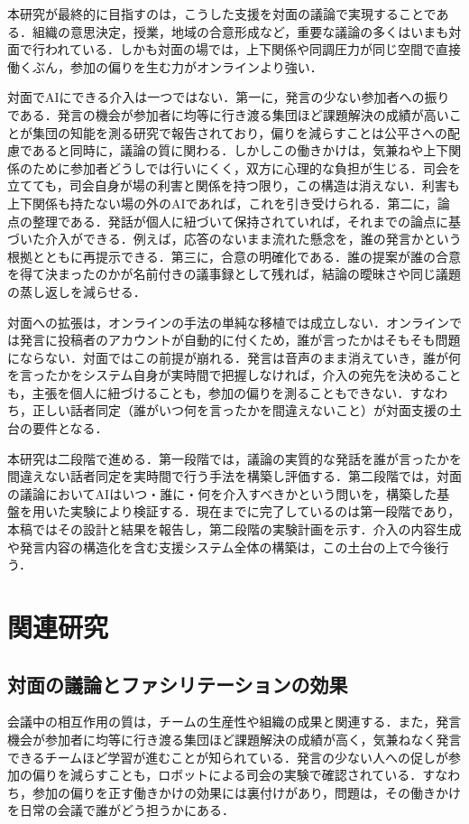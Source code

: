 \documentclass[a4paper]{ltjsarticle}
\begin{document}
本研究が最終的に目指すのは，こうした支援を対面の議論で実現することである．組織の意思決定，授業，地域の合意形成など，重要な議論の多くはいまも対面で行われている．しかも対面の場では，上下関係や同調圧力が同じ空間で直接働くぶん，参加の偏りを生む力がオンラインより強い．

対面でAIにできる介入は一つではない．第一に，発言の少ない参加者への振りである．発言の機会が参加者に均等に行き渡る集団ほど課題解決の成績が高いことが集団の知能を測る研究で報告されており\cite{woolley}，偏りを減らすことは公平さへの配慮であると同時に，議論の質に関わる．しかしこの働きかけは，気兼ねや上下関係のために参加者どうしでは行いにくく，双方に心理的な負担が生じる．司会を立てても，司会自身が場の利害と関係を持つ限り，この構造は消えない．利害も上下関係も持たない場の外のAIであれば，これを引き受けられる．第二に，論点の整理である．発話が個人に紐づいて保持されていれば，それまでの論点に基づいた介入ができる．例えば，応答のないまま流れた懸念を，誰の発言かという根拠とともに再提示できる．第三に，合意の明確化である．誰の提案が誰の合意を得て決まったのかが名前付きの議事録として残れば，結論の曖昧さや同じ議題の蒸し返しを減らせる．

対面への拡張は，オンラインの手法の単純な移植では成立しない．オンラインでは発言に投稿者のアカウントが自動的に付くため，誰が言ったかはそもそも問題にならない．対面ではこの前提が崩れる．発言は音声のまま消えていき，誰が何を言ったかをシステム自身が実時間で把握しなければ，介入の宛先を決めることも，主張を個人に紐づけることも，参加の偏りを測ることもできない．すなわち，正しい話者同定（誰がいつ何を言ったかを間違えないこと）が対面支援の土台の要件となる．

本研究は二段階で進める．第一段階では，議論の実質的な発話を誰が言ったかを間違えない話者同定を実時間で行う手法を構築し評価する．第二段階では，対面の議論においてAIはいつ・誰に・何を介入すべきかという問いを，構築した基盤を用いた実験により検証する．現在までに完了しているのは第一段階であり，本稿ではその設計と結果を報告し，第二段階の実験計画を示す．介入の内容生成や発言内容の構造化を含む支援システム全体の構築は，この土台の上で今後行う．

\section{関連研究}
\subsection{対面の議論とファシリテーションの効果}
会議中の相互作用の質は，チームの生産性や組織の成果と関連する\cite{kauffeld}．また，発言機会が参加者に均等に行き渡る集団ほど課題解決の成績が高く\cite{woolley}，気兼ねなく発言できるチームほど学習が進むことが知られている\cite{edmondson}．発言の少ない人への促しが参加の偏りを減らすことも，ロボットによる司会の実験で確認されている\cite{asadi}．すなわち，参加の偏りを正す働きかけの効果には裏付けがあり，問題は，その働きかけを日常の会議で誰がどう担うかにある．
\end{document}
